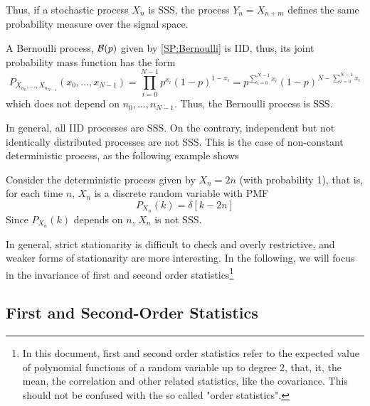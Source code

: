 Thus, if a stochastic process $X_n$ is SSS, the process $Y_n = X_{n+m}$ defines the same probability measure over the signal space. 

\begin{example}
\label{Ex:BinaryRandom}

A Bernoulli process, ${\cal B}(p)$ given by \eqref{SP:Bernoulli} is IID, thus, its joint probability mass function has the form
\begin{equation}
P_{X_{n_0},\ldots,X_{n_{N-1}}}(x_0,\ldots,x_{N-1})
    = \prod_{i=0}^{N-1} p^{x_i} (1-p)^{1-x_i}
    = p^{\sum_{i=0}^{N-1}x_i} (1-p)^{N - \sum_{i=0}^{N-1}x_i}
\label{ec:PbOrderN}
\end{equation}
which does not depend on $n_0, \ldots, n_{N-1}$. Thus, the Bernoulli process is SSS. 
 
\end{example}

In general, all IID processes are SSS. On the contrary, independent but not identically distributed processes are not SSS. This is the case of non-constant deterministic process, as the following example shows

\begin{example}
\label{Ex:SPdeterministic}

Consider the deterministic process given by $X_n = 2 n$ (with probability 1), that is, for each time $n$, $X_n$ is a discrete random variable with PMF
\begin{equation}
P_{X_n}(k) = \delta[k-2 n]
\end{equation}
Since $P_{X_n}(k)$ depends on $n$, $X_n$ is not SSS.

\end{example}

In general, strict stationarity is difficult to check and overly restrictive, and weaker forms of stationarity are more interesting. In the following, we will focus in the invariance of first and second order statistics\footnote{In this document, first and second order statistics refer to the expected value of polynomial functions of a random variable up to degree 2, that, it, the mean, the correlation and other related statistics, like the covariance. This should not be confused with the so called "order statistics".}


\subsection{First and Second-Order Statistics}
\label{sec:CaracterizProcStoc}

